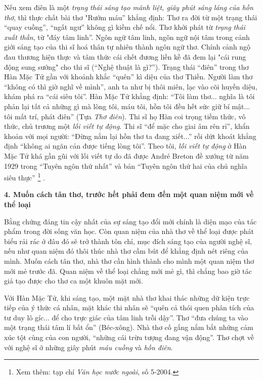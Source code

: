 \documentclass[../main.tex]{subfiles}
\begin{document}
\begin{multicols}{2}
Nếu xem điên là một \textit{trạng thái sáng tạo mãnh liệt, giây phút sáng láng} \textit{của hồn thơ}, thì thực chất bài thơ "Rướm máu” khẳng định: Thơ ra đời từ một trạng thái “quay cuồng”, “ngất ngư” không gì kiềm chế nổi. Thơ khởi phát từ \textit{trạng thái xuất thần}, từ "đáy tâm linh”. Ngôn ngữ tâm linh, ngôn ngữ nội tâm trong cảnh giới sáng tạo của thi sĩ hoá thân tự nhiên thành ngôn ngữ thơ. Chính cảnh ngộ đau thương hiện thực và tâm thức cái chết đương liền kề đã đem lại "cái rung động sung sướng" cho thi sĩ (“Nghệ thuật là gì?”). Trạng thái “điên” trong thơ Hàn Mặc Tử gần với khoảnh khắc “quên” kì diệu của thơ Thiền. Người làm thơ “không có thì giờ nghĩ về mình”, anh ta như bị thôi miên, lạc vào cõi huyền diệu, khám phá ra “cái siêu tôi”. Hàn Mặc Tử khẳng định: “Tôi làm thơ... nghĩa là tôi phản lại tất cả những gì mà lòng tôi, máu tôi, hồn tôi đều hết sức giữ bí mật... tôi mất trí, phát điên” (Tựa \textit{Thơ điên}). Thi sĩ họ Hàn coi trọng tiềm thức, vô thức, chủ trương một \textit{lối viết tự động}. Thi sĩ “để mặc cho giai âm rên rỉ”, khẩn khoản với mọi người: “Đừng nắm lại hồn thơ ta đang xiết...” rồi dứt khoát khẳng định “không ai ngăn cản được tiếng lòng tôi”. Theo tôi, \textit{lối viết tự động} ở Hàn Mặc Tử khá gần gũi với lối viết tự do đã được André Breton đề xướng từ năm 1929 trong “Tuyên ngôn thứ nhất” và bản “Tuyên ngôn thứ hai của chủ nghĩa siêu thực” \footnote{
Xem thêm: tạp chí \textit{Văn học nước ngoài}, số 5-2004.} .  
 
 
\textbf{4. Muốn cách tân thơ, trước hết phải đem đến một quan niệm mới về thể loại} 
  
Bằng chứng đáng tin cậy nhất của sự sáng tạo đổi mới chính là diện mạo của tác phẩm trong đời sống văn học. Còn quan niệm của nhà thơ về thể loại được phát biểu rải rác ở đâu đó sẽ trở thành tôn chỉ, mục đích sáng tạo của người nghệ sĩ, nếu như quan niệm đó thôi thúc nhà thơ cầm bút để khẳng định nét riêng của mình. Muốn cách tân thơ, nhà thơ cần hình thành cho mình một quan niệm thơ mới mẻ trước đã. Quan niệm về thể loại chẳng mới mẻ gì, thì chẳng bao giờ tác giả tạo được cho thơ ca một khuôn mặt mới. 
 
Với Hàn Mặc Tử, khi sáng tạo, một mặt nhà thơ khai thác những dữ kiện trực tiếp của ý thức cá nhân, mặt khác thi nhân sẽ “quên cả thói quen phân tích của tư duy lô gíc... để cho trực giác của tâm linh trỗi dậy”. Thơ “đưa chúng ta vào một trạng thái tâm lí bất ổn” (Béc-xông). Nhà thơ cố gắng nắm bắt những cảm xúc tột cùng của con người, “những cái trừu tượng đang vận động”. Thơ chợt về với nghệ sĩ ở những giây phút \textit{máu cuồng} và \textit{hồn điên}. 
 

\end{multicols}
\end{document}
